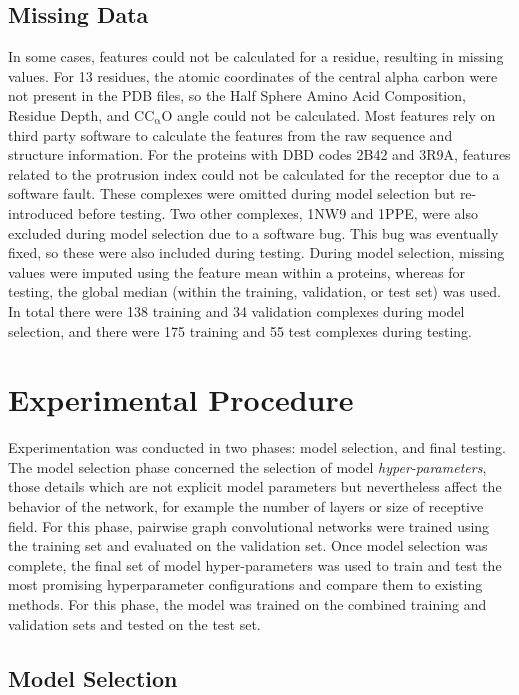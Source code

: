 \subsection{Missing Data}
In some cases, features could not be calculated for a residue, resulting in missing values.
For 13 residues, the atomic coordinates of the central alpha carbon were not present in the PDB files, so the Half Sphere Amino Acid Composition, Residue Depth, and $\mathrm{C C_{\alpha} O}$ angle could not be calculated.
Most features rely on third party software to calculate the features from the raw sequence and structure information.
For the proteins with DBD codes 2B42 and 3R9A, features related to the protrusion index could not be calculated for the receptor due to a software fault.
These complexes were omitted during model selection but re-introduced before testing.
Two other complexes, 1NW9 and 1PPE, were also excluded during model selection due to a software bug.
This bug was eventually fixed, so these were also included during testing. 
During model selection, missing values were imputed using the feature mean within a proteins, whereas for testing, the global median (within the training, validation, or test set) was used.
In total there were 138 training and 34 validation complexes during model selection, and there were 175 training and 55 test complexes during testing.

\section{Experimental Procedure}

Experimentation was conducted in two phases: model selection, and final testing.
The model selection phase concerned the selection of model \emph{hyper-parameters}, those details which are not explicit model parameters but nevertheless affect the behavior of the network, for example the number of layers or size of receptive field.
For this phase, pairwise graph convolutional networks were trained using the training set and evaluated on the validation set.
Once model selection was complete, the final set of model hyper-parameters was used to train and test the most promising hyperparameter configurations and compare them to existing methods.
For this phase, the model was trained on the combined training and validation sets and tested on the test set.


\subsection{Model Selection}

